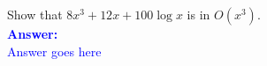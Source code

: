 \item{}
Show that $8x^3+12x+100\log x$ is in $O(x^3)$.
\\[12pt]
\ifanswers
\textcolor{blue}{
\textbf{Answer:}\\[6pt]
Answer goes here
}
\newpage
\fi
